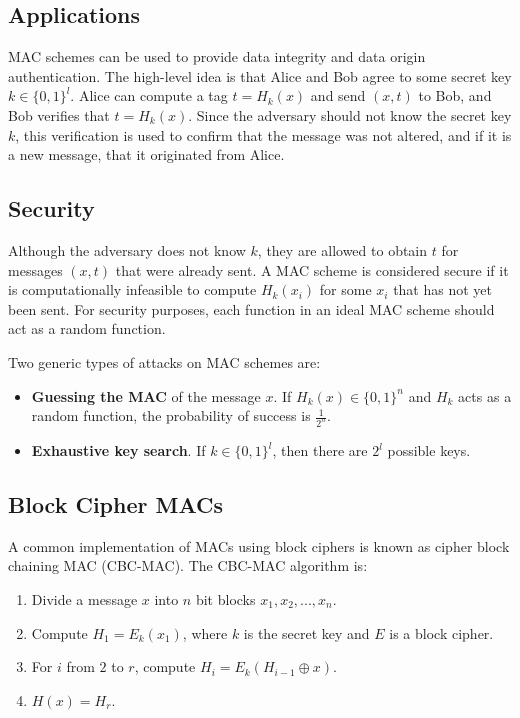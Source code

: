 \documentclass[12pt,titlepage]{article}
\begin{document}
    \subsection{Applications}
      MAC schemes can be used to provide data integrity and data origin authentication. The high-level idea is that Alice and Bob agree to some secret key $k \in \{0, 1\}^l$.
      Alice can compute a tag $t = H_k(x)$ and send $(x, t)$ to Bob, and Bob verifies that $t = H_k(x)$. Since the adversary should not know the secret key $k$, this verification
      is used to confirm that the message was not altered, and if it is a new message, that it originated from Alice.

    \subsection{Security}
      Although the adversary does not know $k$, they are allowed to obtain $t$ for messages $(x, t)$ that were already sent. A MAC scheme is considered secure if it is
      computationally infeasible to compute $H_k(x_i)$ for some $x_i$ that has not yet been sent. For security purposes, each function in an ideal MAC scheme should act
      as a random function.

      Two generic types of attacks on MAC schemes are:
      \begin{itemize}
        \item \textbf{Guessing the MAC} of the message $x$. If $H_k(x) \in \{0, 1\}^n$ and $H_k$ acts as a random function, the probability of success is $\frac{1}{2^n}$.
        \item \textbf{Exhaustive key search}. If $k \in \{0, 1\}^l$, then there are $2^l$ possible keys.
      \end{itemize}

    \subsection{Block Cipher MACs}
      A common implementation of MACs using block ciphers is known as cipher block chaining MAC (CBC-MAC). The CBC-MAC algorithm is:
      \begin{enumerate}
        \item Divide a message $x$ into $n$ bit blocks $x_1, x_2, ..., x_n$.
        \item Compute $H_1 = E_k(x_1)$, where $k$ is the secret key and $E$ is a block cipher.
        \item For $i$ from $2$ to $r$, compute $H_i = E_k(H_{i-1} \oplus x)$.
        \item $H(x) = H_r$.
      \end{enumerate}
\end{document}
